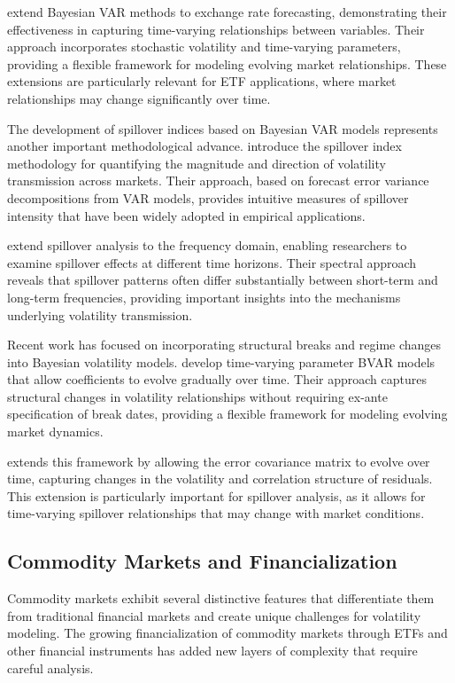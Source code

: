 \citet{carriero2015forecasting} extend Bayesian VAR methods to exchange rate forecasting, demonstrating their effectiveness in capturing time-varying relationships between variables. Their approach incorporates stochastic volatility and time-varying parameters, providing a flexible framework for modeling evolving market relationships. These extensions are particularly relevant for ETF applications, where market relationships may change significantly over time.

The development of spillover indices based on Bayesian VAR models represents another important methodological advance. \citet{diebold2012measuring} introduce the spillover index methodology for quantifying the magnitude and direction of volatility transmission across markets. Their approach, based on forecast error variance decompositions from VAR models, provides intuitive measures of spillover intensity that have been widely adopted in empirical applications.

\citet{barunik2018measuring} extend spillover analysis to the frequency domain, enabling researchers to examine spillover effects at different time horizons. Their spectral approach reveals that spillover patterns often differ substantially between short-term and long-term frequencies, providing important insights into the mechanisms underlying volatility transmission.

Recent work has focused on incorporating structural breaks and regime changes into Bayesian volatility models. \citet{clark2008forecasting} develop time-varying parameter BVAR models that allow coefficients to evolve gradually over time. Their approach captures structural changes in volatility relationships without requiring ex-ante specification of break dates, providing a flexible framework for modeling evolving market dynamics.

\citet{primiceri2005time} extends this framework by allowing the error covariance matrix to evolve over time, capturing changes in the volatility and correlation structure of residuals. This extension is particularly important for spillover analysis, as it allows for time-varying spillover relationships that may change with market conditions.

\subsection{Commodity Markets and Financialization}

Commodity markets exhibit several distinctive features that differentiate them from traditional financial markets and create unique challenges for volatility modeling. The growing financialization of commodity markets through ETFs and other financial instruments has added new layers of complexity that require careful analysis.

